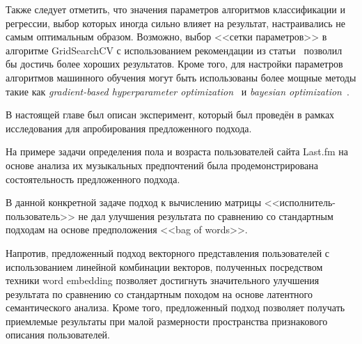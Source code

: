 Также следует отметить, что значения параметров алгоритмов классификации и
регрессии, выбор которых иногда сильно влияет на результат, настраивались
не самым оптимальным образом. Возможно, выбор <<сетки параметров>> в
алгоритме GridSearchCV с использованием рекомендации из
статьи~\cite{hsu2003practical} позволил бы достичь более хороших результатов.
Кроме того, для настройки параметров алгоритмов машинного обучения
могут быть использованы более мощные методы такие как 
\textit{gradient-based hyperparameter optimization}~\cite{maclaurin2015gradient}
и \textit{bayesian optimization}~\cite{hutter2011sequential}.

\chapterconclusion

В настоящей главе был описан эксперимент, который был проведён
в рамках исследования для апробирования предложенного подхода.

На примере задачи определения пола и
возраста пользователей сайта Last.fm на основе анализа их
музыкальных предпочтений была продемонстрирована
состоятельность предложенного подхода.

В данной конкретной задаче подход к вычислению матрицы
<<исполнитель-пользователь>> не дал улучшения результата по
сравнению со стандартным подходам на основе предположения
<<bag of words>>.

Напротив, предложенный подход векторного представления пользователей
с использованием линейной комбинации векторов, полученных
посредством техники word embedding позволяет достигнуть
значительного улучшения результата по сравнению со стандартным
походом на основе латентного семантического анализа. Кроме того,
предложенный подход позволяет получать приемлемые результаты
при малой размерности пространства признакового описания пользователей.

